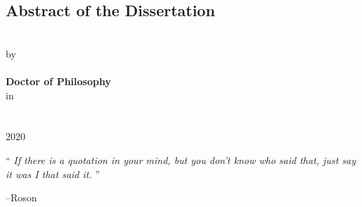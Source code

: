 \documentclass[
12pt, %
oneside, %
english, %
singlespacing, %
liststotoc, %
]{MastersDoctoralThesis} %
\begin{document}
\begin{singlespace}
\begin{center}
\end{center}


\renewcommand{\abstractname}{Abstract of the Dissertation}
\begin{center}
	\section*{\abstractname}

		\textbf{\ttitle} \\ [0.5cm]
		by  \\ [0.5cm]
		\textbf{\authorname} \\ [0.5cm]
		\textbf{Doctor of Philosophy} \\ [0.5cm]
		in \\ [0.5cm]
		\textbf{\deptname}  \\ [0.5cm]
		\univname  \\ [0.5cm]
		2020  \\ [0.5cm]
\end{center}


\end{singlespace}
\newpage



\vspace*{0.2\textheight}

\noindent\enquote{\itshape 
If there is a quotation in your mind, but you don't know who said that, just say it was I that said it.
}\bigbreak

\hfill --Roson


\tableofcontents %
\end{document}
